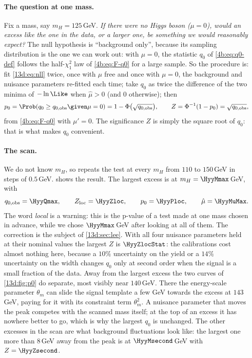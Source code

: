 \paragraph{The question at one mass.}
Fix a mass, say $m_H=125\,$GeV. \emph{If there were no Higgs boson ($\mu=0$), would an
excess like the one in the data, or a larger one, be something we would reasonably
expect?} The null hypothesis is ``background only'', because its sampling distribution is
the one we can work out: with $\mu=0$, the statistic $q_0$ of \eqref{4b:eq:q0-def} follows
the half-$\chi^2_1$ law of \eqref{4b:eq:F-q0} for a large sample. So the procedure is: fit
\eqref{13d:eq:nll} twice, once with $\mu$ free and once with $\mu=0$, the background and
nuisance parameters re-fitted each time; take $q_0$ as twice the difference of the two
minima of $-\ln\Like$ when $\hat\mu>0$ (and $0$ otherwise); then
\begin{equation}
  p_0=\Prob(q_0\ge q_{0,\rm obs}\given\mu=0)=1-\Phi\bigl(\sqrt{q_{0,\rm obs}}\bigr),
  \qquad
  Z=\Phi^{-1}(1-p_0)=\sqrt{q_{0,\rm obs}},
  \label{13d:eq:p0}
\end{equation}
from \eqref{4b:eq:F-q0} with $\mu'=0$. The significance $Z$ is simply the square root of
$q_0$: that is what makes $q_0$ convenient.

\paragraph{The scan.}
We do not know $m_H$, so  repeats the test at every
$m_H$ from $110$ to $150\,$GeV in steps of $0.5\,$GeV.  shows the
result. The largest excess is at $m_H=\HyyMmax\,$GeV, with
\[
  q_{0,\rm obs}=\HyyQmax,\qquad Z_{\rm loc}=\HyyZloc,\qquad p_{0}=\HyyPloc,\qquad
  \hat\mu=\HyyMuMax .
\]
The word \emph{local} is a warning: this is the p-value of a test made at one mass
chosen in advance, while we chose $\HyyMmax\,$GeV after looking at all of them. The
correction is the subject of \cref{13d:sec:lee}. With all four nuisance parameters held at
their nominal values the largest $Z$ is $\HyyZlocStat$: the calibrations cost almost
nothing here, because a $10\%$ uncertainty on the yield or a $14\%$ uncertainty on the
width changes $q_0$ only at second order when the signal is a small fraction of the
data. Away from the largest excess the two curves of \cref{13d:fig:p0} do separate, most
visibly near $140\,$GeV. There the energy-scale parameter $\theta_m$ can slide the
signal template a few GeV towards the excess at $143\,$GeV, paying for it with its
constraint term $\theta_m^2$. A nuisance parameter that moves the peak competes with the
scanned mass itself; at the top of an excess it has nowhere better to go, which is why the
largest $q_0$ is unchanged. The other excesses in the scan are what background fluctuations look like: the
largest one more than $8\,$GeV away from the peak is at $\HyyMsecond\,$GeV with
$Z=\HyyZsecond$.

